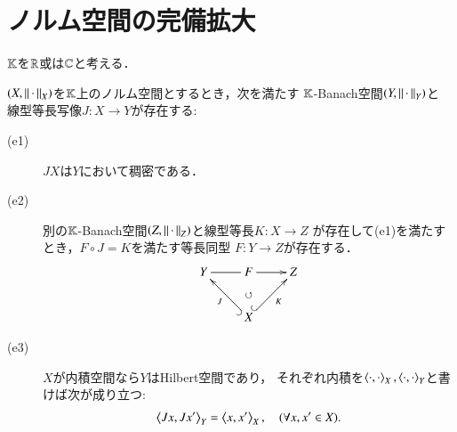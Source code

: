 \section{ノルム空間の完備拡大}
	$\mathbb{K}$を$\mathbb{R}$或は$\mathbb{C}$と考える．
	\begin{screen}
		\begin{thm}[完備拡大の存在定理]\label{thm:expansion_of_normed_space}
			$(X,\left\|\, \cdot\, \right\|_{X})$を$\mathbb{K}$上のノルム空間とするとき，次を満たす
			$\mathbb{K}$-Banach空間$(Y,\left\|\, \cdot\, \right\|_{Y})$と
			線型等長写像$J:X \longrightarrow Y$が存在する:
			\begin{description}
				\item[(e1)] $JX$は$Y$において稠密である．
				\item[(e2)] 別の$\mathbb{K}$-Banach空間$(Z,\left\|\, \cdot\, \right\|_{Z})$と線型等長$K:X \longrightarrow Z$
					が存在して(e1)を満たすとき，$F \circ J = K$を満たす等長同型
					$F:Y \longrightarrow Z$が存在する．
					\begin{align}
						\xymatrix{
							Y \ar@{-}[r] & F \ar[r] & Z \\
							& X \ar@{^{(}->}[lu]^-J \ar@{}[u]|\circlearrowleft \ar@{^{(}->}[ru]_-K & 
						}
					\end{align}
				\item[(e3)] $X$が内積空間なら$Y$はHilbert空間であり，
					それぞれ内積を$\inprod<\cdot,\cdot>_X,\inprod<\cdot,\cdot>_Y$と書けば次が成り立つ:
					\begin{align}
						\inprod<J x, J x'>_Y = \inprod<x,x'>_X,
						\quad (\forall x,x' \in X).
					\end{align}
			\end{description}
		\end{thm}
	\end{screen}
	
